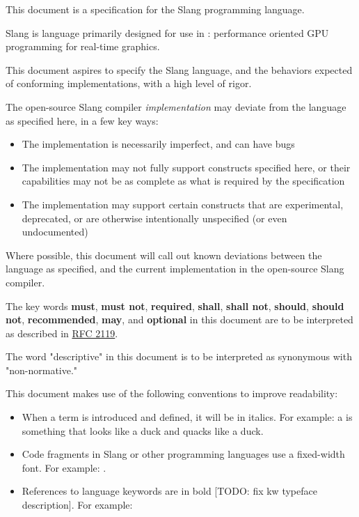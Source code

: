 

This document is a specification for the Slang programming language.

Slang is language primarily designed for use in : performance oriented GPU programming for real-time graphics.


This document aspires to specify the Slang language, and the behaviors expected of conforming implementations, with a high level of rigor.

The open-source Slang compiler \emph{implementation} may deviate from the language as specified here, in a few key ways:

\begin{itemize}
    \item{The implementation is necessarily imperfect, and can have bugs}
    \item{The implementation may not fully support constructs specified here, or their capabilities may not be as complete as what is required by the specification}
    \item{The implementation may support certain constructs that are experimental, deprecated, or are otherwise intentionally unspecified (or even undocumented)}
\end{itemize}

Where possible, this document will call out known deviations between the language as specified, and the current implementation in the open-source Slang compiler.


The key words \textbf{must}, \textbf{must not}, \textbf{required}, \textbf{shall}, \textbf{shall not}, \textbf{should}, \textbf{should not}, \textbf{recommended}, \textbf{may}, and \textbf{optional} in this document are to be interpreted as described in \href{https://www.ietf.org/rfc/rfc2119.txt}{RFC 2119}.

The word "descriptive" in this document is to be interpreted as synonymous with "non-normative."


This document makes use of the following conventions to improve readability:

\begin{itemize}
    \item{When a term is introduced and defined, it will be in italics. For example: a  is something that looks like a duck and quacks like a duck.}
    \item{Code fragments in Slang or other programming languages use a fixed-width font. For example: .}
    \item{References to language keywords are in bold [TODO: fix kw typeface description]. For example: }
\end{itemize}

